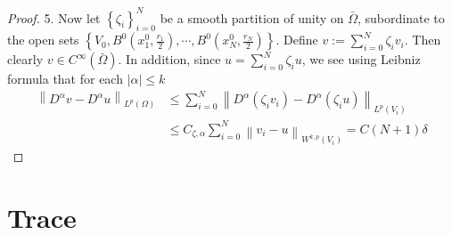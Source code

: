 \begin{theorem}
\begin{proof}
        5. Now let $\left\{\zeta_i\right\}_{i=0}^N$ be a smooth partition of unity on $\bar{\Omega}$, subordinate to the open sets $\left\{V_0, B^0\left(x_1^0, \frac{r_1}{2}\right), \cdots, B^0\left(x_N^0, \frac{r_N}{2}\right)\right\}$. Define $v:=\sum_{i=0}^N \zeta_i v_i$.
        Then clearly $v \in C^{\infty}(\bar{\Omega})$. In addition, since $u=\sum_{i=0}^N \zeta_i u$, we see using Leibniz formula that for each $\left|\alpha\right| \leq k$
        $$
            \begin{aligned}
                \left\|D^\alpha v-D^\alpha u\right\|_{L^p\left(\Omega\right)} & \leq \sum_{i=0}^N\left\|D^\alpha\left(\zeta_i v_i\right)-D^\alpha\left(\zeta_i u\right)\right\|_{L^p\left(V_i\right)} \\
                                                                              & \leq C_{\zeta,\alpha} \sum_{i=0}^N\left\|v_i-u\right\|_{W^{k, p}\left(V_i\right)}=C(N+1) \delta
            \end{aligned}
        $$
    \end{proof}
\end{theorem}



\section{Trace}

